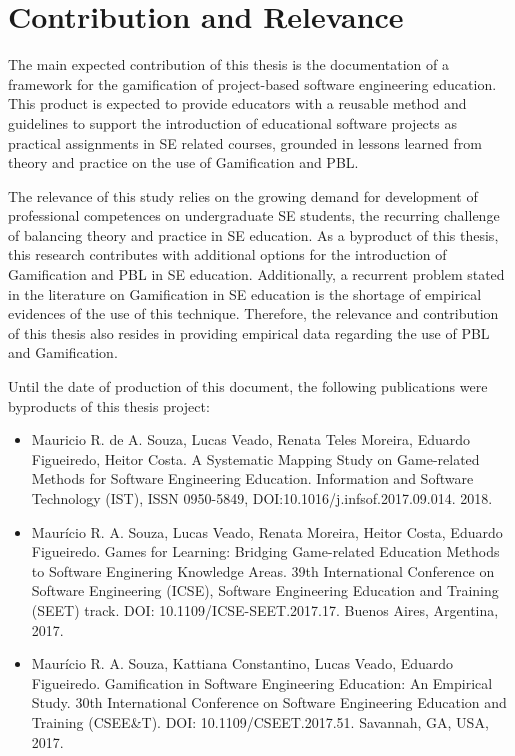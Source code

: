 \section{Contribution and Relevance}
\label{sec:contribution}

The main expected contribution of this thesis is the documentation of a framework for the gamification of project-based software engineering education. This product is expected to provide educators with a reusable method and guidelines to support the introduction of educational software projects as practical assignments in SE related courses, grounded in lessons learned from theory and practice on the use of Gamification and PBL.

The relevance of this study relies on the growing demand for development of professional competences on undergraduate SE students, the recurring challenge of balancing theory and practice in SE education. As a byproduct of this thesis, this research contributes with additional options for the introduction of Gamification and PBL in SE education. Additionally, a recurrent problem stated in the literature on Gamification in SE education is the shortage of empirical evidences of the use of this technique. Therefore, the relevance and contribution of this thesis also resides in providing empirical data regarding the use of PBL and Gamification.

Until the date of production of this document, the following publications were byproducts of this thesis project:

\begin{itemize}
    \item Mauricio R. de A. Souza, Lucas Veado, Renata Teles Moreira, Eduardo Figueiredo, Heitor Costa. A Systematic Mapping Study on Game-related Methods for Software Engineering Education. Information and Software Technology (IST), ISSN 0950-5849, DOI:10.1016/j.infsof.2017.09.014. 2018.
    \item Maurício R. A. Souza, Lucas Veado, Renata Moreira, Heitor Costa, Eduardo Figueiredo. Games for Learning: Bridging Game-related Education Methods to Software Enginering Knowledge Areas. 39th International Conference on Software Engineering (ICSE), Software Engineering Education and Training (SEET) track. DOI: 10.1109/ICSE-SEET.2017.17. Buenos Aires, Argentina, 2017.
    \item Maurício R. A. Souza, Kattiana Constantino, Lucas Veado, Eduardo Figueiredo. Gamification in Software Engineering Education: An Empirical Study. 30th International Conference on Software Engineering Education and Training (CSEE\&T).  DOI: 10.1109/CSEET.2017.51. Savannah, GA, USA, 2017.
\end{itemize}

